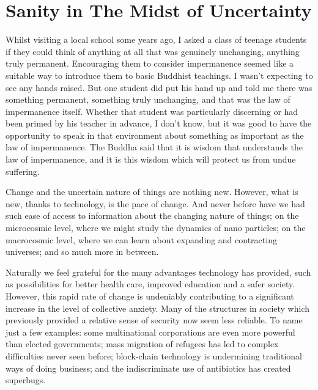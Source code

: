 
\chapter{Sanity in The Midst of Uncertainty}

\enlargethispage{\baselineskip}

Whilst visiting a local school some years ago, I asked a class of
teenage students if they could think of anything at all that was
genuinely unchanging, anything truly permanent. Encouraging them to
consider impermanence seemed like a suitable way to introduce them to
basic Buddhist teachings. I wasn't expecting to see any hands raised.
But one student did put his hand up and told me there was something
permanent, something truly unchanging, and that was the law of
impermanence itself. Whether that student was particularly discerning or
had been primed by his teacher in advance, I don't know, but it was good
to have the opportunity to speak in that environment about something as
important as the law of impermanence. The Buddha said that it is wisdom
that understands the law of impermanence, and it is this wisdom which
will protect us from undue suffering.

\enlargethispage{\baselineskip}

Change and the uncertain nature of things are nothing new. However, what
is new, thanks to technology, is the pace of change. And never before
have we had such ease of access to information about the changing nature
of things; on the microcosmic level, where we might study the dynamics
of nano particles; on the macrocosmic level, where we can learn about
expanding and contracting universes; and so much more in between.

\clearpage

Naturally we feel grateful for the many advantages technology has
provided, such as possibilities for better health care, improved
education and a safer society. However, this rapid rate of change is
undeniably contributing to a significant increase in the level of
collective anxiety. Many of the structures in society which previously
provided a relative sense of security now seem less reliable. To name
just a few examples: some multinational corporations are even more
powerful than elected governments; mass migration of refugees has led to
complex difficulties never seen before; block-chain technology is
undermining traditional ways of doing business; and the indiscriminate
use of antibiotics has created superbugs.

